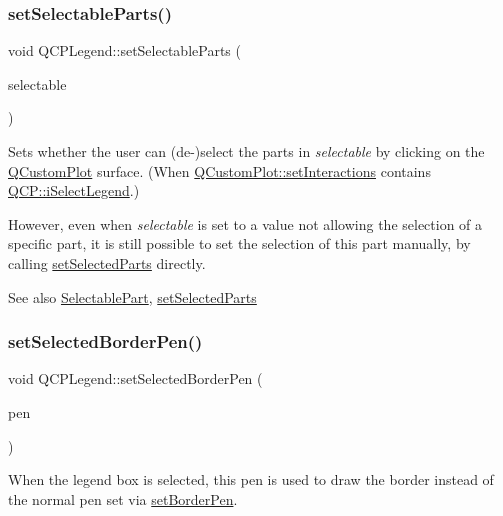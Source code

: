 \subsubsection{\texorpdfstring{set\+Selectable\+Parts()}{setSelectableParts()}}
{\footnotesize\ttfamily void Q\+C\+P\+Legend\+::set\+Selectable\+Parts (\begin{DoxyParamCaption}\item[{const Selectable\+Parts \&}]{selectable }\end{DoxyParamCaption})}

Sets whether the user can (de-\/)select the parts in {\itshape selectable} by clicking on the \mbox{\hyperlink{class_q_custom_plot}{Q\+Custom\+Plot}} surface. (When \mbox{\hyperlink{class_q_custom_plot_a5ee1e2f6ae27419deca53e75907c27e5}{Q\+Custom\+Plot\+::set\+Interactions}} contains \mbox{\hyperlink{namespace_q_c_p_a2ad6bb6281c7c2d593d4277b44c2b037a269c9af298e257d1108edec0432b5513}{Q\+C\+P\+::i\+Select\+Legend}}.)

However, even when {\itshape selectable} is set to a value not allowing the selection of a specific part, it is still possible to set the selection of this part manually, by calling \mbox{\hyperlink{class_q_c_p_legend_a2aee309bb5c2a794b1987f3fc97f8ad8}{set\+Selected\+Parts}} directly.

\begin{DoxySeeAlso}{See also}
\mbox{\hyperlink{class_q_c_p_legend_a5404de8bc1e4a994ca4ae69e2c7072f1}{Selectable\+Part}}, \mbox{\hyperlink{class_q_c_p_legend_a2aee309bb5c2a794b1987f3fc97f8ad8}{set\+Selected\+Parts}} 
\end{DoxySeeAlso}
\mbox{\label{class_q_c_p_legend_a2c35d262953a25d96b6112653fbefc88}} 
\subsubsection{\texorpdfstring{set\+Selected\+Border\+Pen()}{setSelectedBorderPen()}}
{\footnotesize\ttfamily void Q\+C\+P\+Legend\+::set\+Selected\+Border\+Pen (\begin{DoxyParamCaption}\item[{const Q\+Pen \&}]{pen }\end{DoxyParamCaption})}

When the legend box is selected, this pen is used to draw the border instead of the normal pen set via \mbox{\hyperlink{class_q_c_p_legend_a866a9e3f5267de7430a6c7f26a61db9f}{set\+Border\+Pen}}.

